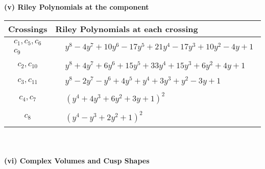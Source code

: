 \documentclass[1p]{elsarticle_modified}
\theoremstyle{definition}
\begin{document}
\newpage\renewcommand{\arraystretch}{1}
\flushleft \textbf{(v) Riley Polynomials at the component}\newline \\
\begin{tabular}{m{50pt}|m{274pt}}
Crossings & \hspace{64pt}Riley Polynomials at each crossing \\
\hline $$\begin{aligned}c_{1},c_{5},c_{6}\\c_{9}\end{aligned}$$&$\begin{aligned}
&y^8-4 y^7+10 y^6-17 y^5+21 y^4-17 y^3+10 y^2-4 y+1
\end{aligned}$\\
\hline $$\begin{aligned}c_{2},c_{10}\end{aligned}$$&$\begin{aligned}
&y^8+4 y^7+6 y^6+15 y^5+33 y^4+15 y^3+6 y^2+4 y+1
\end{aligned}$\\
\hline $$\begin{aligned}c_{3},c_{11}\end{aligned}$$&$\begin{aligned}
&y^8-2 y^7- y^6+4 y^5+y^4+3 y^3+y^2-3 y+1
\end{aligned}$\\
\hline $$\begin{aligned}c_{4},c_{7}\end{aligned}$$&$\begin{aligned}
&(y^4+4 y^3+6 y^2+3 y+1)^2
\end{aligned}$\\
\hline $$\begin{aligned}c_{8}\end{aligned}$$&$\begin{aligned}
&(y^4- y^3+2 y^2+1)^2
\end{aligned}$\\
\hline
\end{tabular}\\~\\
\newpage\flushleft \textbf{(vi) Complex Volumes and Cusp Shapes}
\end{document}
